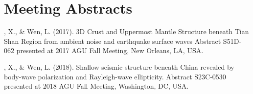 \section*{Meeting Abstracts}
\begin{etaremune}
\item
    \Xiao, X., \& Wen, L. (2017).
    3D Crust and Uppermost Mantle Structure beneath Tian Shan Region from ambient noise and earthquake surface waves 
    Abstract S51D-062 presented at 2017 AGU Fall Meeting, New Orleans, LA, USA.
\item
    \Xiao, X., \& Wen, L. (2018).
    Shallow seismic structure beneath China revealed by body-wave polarization and Rayleigh-wave ellipticity. 
    Abstract S23C-0530 presented at 2018 AGU Fall Meeting, Washington, DC, USA.
\end{etaremune}
